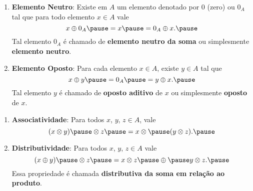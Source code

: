 \documentclass{beamer}
\begin{document}
    \begin{frame}
        \begin{definicao}
            \begin{enumerate}[label={\roman*})]
                \conti

                \item \textbf{Elemento Neutro}: \pause Existe em $A$ \pause um elemento denotado por $0$ \pause (zero)
                    ou $0_{A}$ \pause tal que para todo elemento $x \in A$ \pause vale\pause
                \[
                    x \oplus 0_A \pause = x \pause = 0_A \oplus x.\pause
                \]
                Tal elemento $0_A$ \pause é chamado de \textbf{elemento neutro da soma} \pause ou simplesmente
                \textbf{elemento neutro}.\pause

                \vspace{.7cm}

                \item \textbf{Elemento Oposto}: \pause Para cada elemento $x \in A$, \pause existe $y \in A$ \pause tal
                    que\pause
                \[
                    x \oplus y \pause = 0_A \pause = y \oplus x.\pause
                \]
                Tal elemento $y$ \pause é chamado de \textbf{oposto aditivo} \pause de $x$ \pause ou simplesmente
                \textbf{oposto} de $x$.

                \vspace{.7cm}

                \seti
            \end{enumerate}
        \end{definicao}
    \end{frame}

    \begin{frame}
        \begin{definicao}
            \begin{enumerate}[label={\roman*})]
                \conti

                \item \textbf{Associatividade}: \pause Para todos $x$, \pause $y$, \pause $z \in A$, \pause vale\pause
                \[
                    (x\otimes y) \pause \otimes z \pause = x \otimes \pause (y\otimes z).\pause
                \]

                \vspace{.7cm}

                \item \textbf{Distributividade}: \pause Para todos $x$, \pause $y$, \pause $z \in A$ \pause vale\pause
                \[
                    (x \oplus y) \pause \otimes z \pause = x \otimes z \pause \oplus \pause y\otimes z.\pause
                \]
                Essa propriedade é chamada \textbf{distributiva da soma em relação ao produto}.

                \vspace{.7cm}

                \seti
            \end{enumerate}
        \end{definicao}
    \end{frame}
\end{document}

